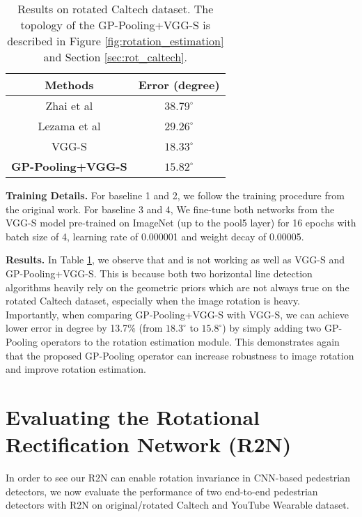 \documentclass[10pt,twocolumn,letterpaper]{article}
\begin{document}
\begin{table}[tb]
\centering
\footnotesize
\begin{tabular}{ |c|c| }
        \hline
        Methods & Error (degree) \\
        \hline
        \hline
        Zhai et al \cite{Zhai2016}          &       $38.79^{\circ}$       \\
        Lezama et al \cite{Lezama2014}      &       $29.26^{\circ}$       \\
        VGG-S \cite{Simonyan2014}           &       $18.33^{\circ}$       \\
        \textbf{GP-Pooling+VGG-S}                    &       $\mathbf{15.82^{\circ}}$       \\
        \hline
\end{tabular}
\vspace{0.2cm}
\caption{Results on rotated Caltech dataset. The topology of the GP-Pooling+VGG-S is described in Figure \ref{fig:rotation_estimation} and Section \ref{sec:rot_caltech}.}
\label{tab:res_caltech} 
\vspace{-0.3cm}
\end{table}

\noindent\textbf{Training Details.} For baseline 1 and 2, we follow the training procedure from the original work. For baseline 3 and 4, We fine-tune both networks from the VGG-S model pre-trained on ImageNet (up to the pool5 layer) for 16 epochs with batch size of 4, learning rate of 0.000001 and weight decay of 0.00005.

\vspace{1mm}\noindent\textbf{Results.} In Table \ref{tab:res_caltech}, we observe that \cite{Zhang2016} and \cite{Lezama2014} is not working as well as VGG-S and GP-Pooling+VGG-S. This is because both two horizontal line detection algorithms heavily rely on the geometric priors which are not always true on the rotated Caltech dataset, especially when the image rotation is heavy. Importantly, when comparing GP-Pooling+VGG-S with VGG-S, we can achieve lower error in degree by 13.7\% (from $18.3^{\circ}$ to $15.8^{\circ}$) by simply adding two GP-Pooling operators to the rotation estimation module. This demonstrates again that the proposed GP-Pooling operator can increase robustness to image rotation and improve rotation estimation.

\section{Evaluating the Rotational Rectification Network (R2N)}
\label{sec:r2n}
In order to see our R2N can enable rotation invariance in CNN-based pedestrian detectors, we now evaluate the performance of two end-to-end pedestrian detectors with R2N on original/rotated Caltech and YouTube Wearable dataset.
\end{document}
